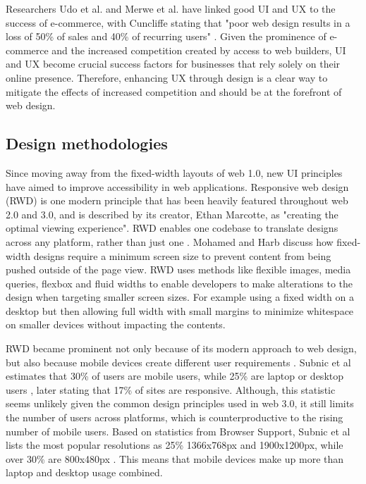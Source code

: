 \documentclass[article]{IEEEtran}
\begin{document}
            Researchers Udo et al. and Merwe et al. have linked good UI \cite{udo} and UX \cite{merwe} to the success of e-commerce, with Cuncliffe stating that "poor web design results in a loss of 50\% of sales and 40\% of recurring users" \cite{cuncliffe}. Given the prominence of e-commerce and the increased competition created by access to web builders, UI and UX become crucial success factors for businesses that rely solely on their online presence. Therefore, enhancing UX through design is a clear way to mitigate the effects of increased competition and should be at the forefront of web design.
            
        \subsection{Design methodologies}
            Since moving away from the fixed-width layouts of web 1.0, new UI principles have aimed to improve accessibility in web applications. Responsive web design (RWD) is one modern principle that has been heavily featured throughout web 2.0 and 3.0, and is described by its creator, Ethan Marcotte, as "creating the optimal viewing experience". RWD enables one codebase to translate designs across any platform, rather than just one \cite{bryant}. Mohamed and Harb \cite{mohamed, harb} discuss how fixed-width designs require a minimum screen size to prevent content from being pushed outside of the page view. RWD uses methods like flexible images, media queries, flexbox and fluid widths to enable developers to make alterations to the design when targeting smaller screen sizes. For example using a fixed width on a desktop but then allowing full width with small margins to minimize whitespace on smaller devices without impacting the contents.
                                    
            RWD became prominent not only because of its modern approach to web design, but also because mobile devices create different user requirements \cite{harb}. Subnic et al estimates that 30\% of users are mobile users, while 25\% are laptop or desktop users \cite{subnic}, later stating that 17\% of sites are responsive. Although, this statistic seems unlikely given the common design principles used in web 3.0, it still limits the number of users across platforms, which is counterproductive to the rising number of mobile users. Based on statistics from Browser Support, Subnic et al lists the most popular resolutions as 25\% 1366x768px and 1900x1200px, while over 30\% are 800x480px \cite{subnic}. This means that mobile devices make up more than laptop and desktop usage combined.
            
\end{document}
